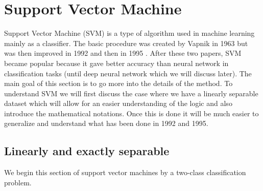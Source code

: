 \documentclass[a4paper,11pt]{article}
\numberwithin{equation}{section}
\begin{document}
\newpage

\section{Support Vector Machine}\label{sec:first}

\doublespacing

Support Vector Machine (SVM) is a type of algorithm used in machine learning mainly as a classifier. The basic procedure was created by Vapnik in 1963 but was then improved in 1992 \cite{Boser:1992:TAO:130385.130401} and then in 1995 \cite{Cortes:1995:SN:218919.218929}. After these two papers, SVM became popular because it gave better accuracy than neural network in classification tasks (until deep neural network which we will discuss later). The main goal of this section is to go more into the details of the method. To understand SVM we will first discuss the case where we have a linearly separable dataset which will allow for an easier understanding of the logic and also introduce the mathematical notations. Once this is done it will be much easier to generalize and understand what has been done in 1992 and 1995. 


\subsection{Linearly and exactly separable}

We begin this section of support vector machines by a two-class classification problem.
\end{document}
